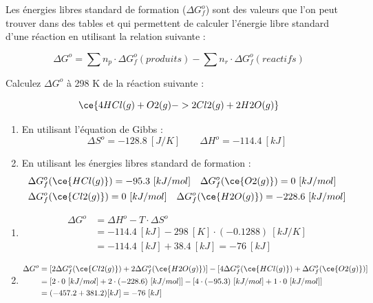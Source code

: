 \documentclass[
  11pt,
  a4paper,
  openany]{book}
\providecommand{\tightlist}{%
  \setlength{\itemsep}{0pt}\setlength{\parskip}{0pt}}
\begin{document}
Les énergies libres standard de formation (\(\Delta G^o_f\)) sont des valeurs que l'on peut trouver dans des tables et qui permettent de calculer l'énergie libre standard d'une réaction en utilisant la relation suivante :

\[
\Delta G^o = \sum n_p \cdot \Delta G^{o}_f(produits) - \sum n_r \cdot \Delta G^{o}_f(reactifs)
\]

\begin{Exercise}

Calculez \(\Delta G^o\) à 298 K de la réaction suivante :

\[ \ce{4 HCl(g) + O2(g) -> 2 Cl2(g) + 2 H2O(g)} \]

\begin{enumerate}
\def\labelenumi{\alph{enumi}.}
\tightlist
\item
  En utilisant l'équation de Gibbs :
  \[
  \Delta S^o = -128.8\ [J/K] \qquad \Delta H^o = -114.4\ [kJ]
  \]
\item
  En utilisant les énergies libres standard de formation :
  \[
  \begin{split}
  & \Delta G^o_f(\ce{HCl(g)}) = -95.3\ [kJ/mol] \quad \Delta G^o_f(\ce{O2(g)}) = 0\ [kJ/mol] \\
  & \Delta G^o_f(\ce{Cl2(g)}) = 0\ [kJ/mol] \quad \Delta G^o_f(\ce{H2O(g)}) = -228.6\ [kJ/mol]
  \end{split}
  \]
\end{enumerate}

\end{Exercise}

\begin{Answer}

\begin{enumerate}
\def\labelenumi{\alph{enumi}.}
\tightlist
\item
  \[
  \begin{split}
  \Delta G^o &= \Delta H^o - T \cdot \Delta S^o \\
   &= -114.4\ [kJ] - 298\ [K] \cdot (-0.1288)\ [kJ/K] \\
   &= -114.4\ [kJ] + 38.4\ [kJ] = -76\ [kJ]
  \end{split}
  \]
\item
  \[
  \begin{split}
  \Delta G^o &= [2 \Delta G^o_f(\ce{Cl2(g)}) + 2 \Delta G^o_f(\ce{H2O(g)})] - [4 \Delta G^o_f(\ce{HCl(g)}) + \Delta G^o_f(\ce{O2(g)})] \\
   &= [2 \cdot 0\ [kJ/mol] + 2 \cdot (-228.6)\ [kJ/mol]] - [4 \cdot (-95.3)\ [kJ/mol] + 1 \cdot 0\ [kJ/mol]] \\
   &= (-457.2 + 381.2) [kJ] = -76\ [kJ]
  \end{split}
  \]
\end{enumerate}

\end{Answer}
\end{document}

